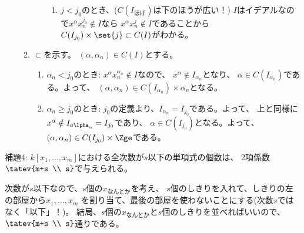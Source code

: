 \begin{myproof}
\begin{enumerate}
\begin{enumerate}
\begin{enumerate}
\begin{enumerate}
          \item $j < j_0$のとき、($C(I_{ほげ})$は下のほうが広い！)
          $I$はイデアルなので$x^\alpha x_n^{j_0}\notin I$なら
          $x^\alpha x_n^j \notin I$であることから
          $C(I_{j_0})\times \set{j} \subset C(I)$がわかる。
        \end{enumerate}
      \end{enumerate}
      \item $\subset$を示す。
      $(\alpha,\alpha_n) \in C(I)$とする。
      \begin{enumerate}
        \item $\alpha_n < j_0$のとき:
        $x^\alpha x_n^{\alpha_n}\notin I$なので、
        $x^\alpha \notin I_{\alpha_n}$となり、
        $\alpha \in C(I_{\alpha_n})$である。よって、
        $(\alpha,\alpha_n) \in C(I_{\alpha_n}) \times {\alpha_n}$となる。
        \item $\alpha_n \ge j_0$のとき:
        $j_0$の定義より、$I_{\alpha_n}  = I_{j_0}$である。よって、
        上と同様に$x^\alpha \notin I_{a\lpha_n} = I_{j_0}$であり、
        $\alpha \in C(I_{j_0})$となる。よって、
        $(\alpha,\alpha_n) \in C(I_{j_0}) \times \Zge$である。
      \end{enumerate}
    \end{enumerate}
  \end{enumerate}
\end{myproof}

\begin{framed}
  補題4:
  $k[x_1,\dots,x_m]$における全次数が$s$以下の単項式の個数は、
  2項係数$\tatev{m+s \\ s}$で与えられる。
\end{framed}
\begin{myproof}
  次数が$s$以下なので、$s$個の$x_{なんとか}$を考え、
  $s$個のしきりを入れて、しきりの左の部屋から$x_1,\dots,x_m$
  を割り当て、最後の部屋を使わないことにする(次数$s$ではなく「以下」！)。
  結局、$s$個の$x_{なんとか}$と$s$個のしきりを並べればいいので、
  $\tatev{m+s \\ s}$通りである。
\end{myproof}

